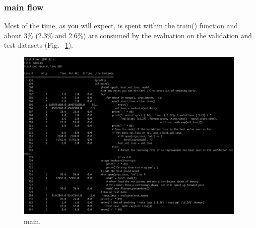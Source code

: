 \documentclass[11pt]{article}
\newcommand{\0}{\mat{0}}
\begin{document}
\begin{itemize}
  \subsubsection*{main flow}
   Most of the time, as you will expect, is spent within the train() function and  about 3\% (2.3\% and 2.6\%)  are consumed by the evaluation on the validation and test datasets (Fig. ~\ref{fig:main}).
   \begin{figure}[h!]
  	\centering
 	 \includegraphics[width=\linewidth]{main.png}
 	 \caption{main.}
 	 \label{fig:main}
   \end{figure}


\end{itemize}
\end{document}
